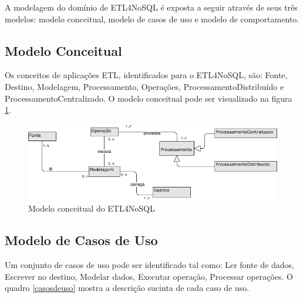 A modelagem do domínio de ETL4NoSQL é exposta a seguir através de seus três modelos: modelo conceitual, modelo de casos de uso e modelo de comportamento.

\subsection{Modelo Conceitual}

Os conceitos de aplicações ETL, identificados para o ETL4NoSQL, são: Fonte, Destino, Modelagem, Processamento, Operações, ProcessamentoDistribuído e ProcessamentoCentralizado. O modelo conceitual pode ser visualizado na figura \ref{modeloconceitual}.

\begin{figure}[h]
	\centering
	\includegraphics[scale=0.6]{fig/modeloconceitual.png}
	\caption{Modelo conceitual do ETL4NoSQL}
	\label{modeloconceitual}
\end{figure}

\subsection{Modelo de Casos de Uso}

Um conjunto de casos de uso pode ser identificado tal como: Ler fonte de dados, Escrever no destino, Modelar dados, Executar operação, Processar operações. O quadro \ref{casosdeuso} mostra a descrição sucinta de cada caso de uso.

